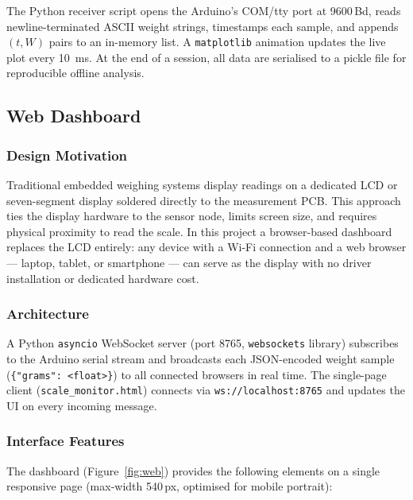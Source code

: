 \documentclass[12pt,a4paper]{article}
\begin{document}
The Python receiver script opens the Arduino's COM/tty port at 9600\,Bd, reads
newline-terminated ASCII weight strings, timestamps each sample, and appends $(t, W)$
pairs to an in-memory list. A \texttt{matplotlib} animation updates the live plot every
\SI{10}{ms}. At the end of a session, all data are serialised to a pickle file for
reproducible offline analysis.

\subsection{Web Dashboard}
\label{sec:web}

\subsubsection{Design Motivation}

Traditional embedded weighing systems display readings on a dedicated LCD or seven-segment
display soldered directly to the measurement PCB. This approach ties the display hardware
to the sensor node, limits screen size, and requires physical proximity to read the scale.
In this project a browser-based dashboard replaces the LCD entirely: any device with a
Wi-Fi connection and a web browser --- laptop, tablet, or smartphone --- can serve as the
display with no driver installation or dedicated hardware cost.

\subsubsection{Architecture}

A Python \texttt{asyncio} WebSocket server (port 8765, \texttt{websockets} library)
subscribes to the Arduino serial stream and broadcasts each JSON-encoded weight sample
(\texttt{\{"grams": <float>\}}) to all connected browsers in real time.
The single-page client (\texttt{scale\_monitor.html}) connects via
\texttt{ws://localhost:8765} and updates the UI on every incoming message.

\subsubsection{Interface Features}

The dashboard (Figure~\ref{fig:web}) provides the following elements on a single
responsive page (max-width 540\,px, optimised for mobile portrait):
\end{document}
